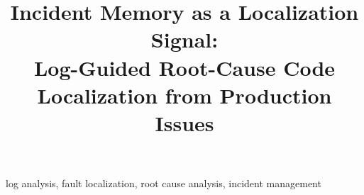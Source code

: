 \documentclass[10pt,conference]{IEEEtran}
\begin{document}
\title{Incident Memory as a Localization Signal:\\
Log-Guided Root-Cause Code Localization from Production Issues}

\author{}

\maketitle

\begin{abstract}
\end{abstract}

\begin{IEEEkeywords}
log analysis, fault localization, root cause analysis, incident management
\end{IEEEkeywords}












\end{document}
